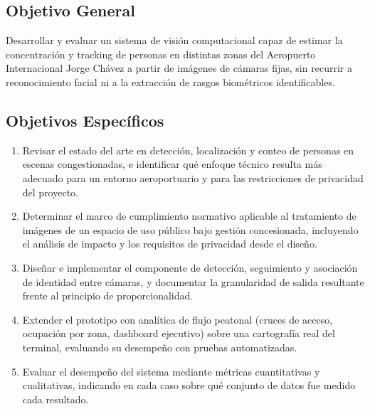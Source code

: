 \subsection{Objetivo General}
\label{subsec:objetivo-general}

Desarrollar y evaluar un sistema de visión computacional capaz de estimar la
concentración y tracking de personas en distintas zonas del Aeropuerto Internacional Jorge
Chávez a partir de imágenes de cámaras fijas, sin recurrir a reconocimiento facial ni a la
extracción de rasgos biométricos identificables.

\subsection{Objetivos Específicos}
\label{subsec:objetivos-especificos}

\begin{enumerate}
  \item Revisar el estado del arte en detección, localización y conteo de personas en escenas
  congestionadas, e identificar qué enfoque técnico resulta más adecuado para un entorno
  aeroportuario y para las restricciones de privacidad del proyecto.
  \item Determinar el marco de cumplimiento normativo aplicable al tratamiento de imágenes
  de un espacio de uso público bajo gestión concesionada, incluyendo el análisis de
  impacto y los requisitos de privacidad desde el diseño.
  \item Diseñar e implementar el componente de detección, seguimiento y asociación de identidad
  entre cámaras, y documentar la granularidad de salida resultante frente al principio de
  proporcionalidad.
  \item Extender el prototipo con analítica de flujo peatonal (cruces de acceso, ocupación por
  zona, dashboard ejecutivo) sobre una cartografía real del terminal, evaluando su
  desempeño con pruebas automatizadas.
  \item Evaluar el desempeño del sistema mediante métricas cuantitativas y cualitativas,
  indicando en cada caso sobre qué conjunto de datos fue medido cada resultado.
\end{enumerate}
